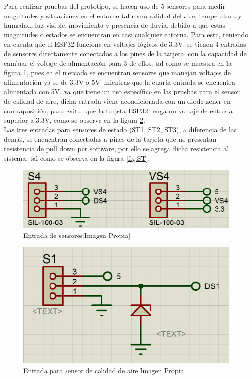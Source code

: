 		Para realizar pruebas del prototipo, se hacen uso de 5 sensores para medir magnitudes y situaciones en el entorno tal como calidad del aire, temperatura y humedad, luz visible, movimiento y presencia de lluvia, debido a que estas magnitudes o estados se encuentran en casi cualquier entorno. Para esto, teniendo en cuenta que el ESP32 funciona en voltajes lógicos de 3.3V, se tienen 4 entradas de sensores directamente conectados a los pines de la tarjeta, con la capacidad de cambiar el voltaje de alimentación para 3 de ellos, tal como se muestra en la figura \ref{fig:SVS}, pues en el mercado se encuentran sensores que manejan voltajes de alimentación ya se de 3.3V o 5V, mientras que la cuarta entrada se encuentra alimentada con 5V, ya que tiene un uso específico en las pruebas para el sensor de calidad de aire, dicha entrada viene acondicionada con un diodo zener en contraposición, para evitar que la tarjeta ESP32 tenga un voltaje de entrada superior a 3.3V, como se observa en la figura \ref{fig:S1Aire}.\\
		
		Las tres entradas para sensores de estado (ST1, ST2, ST3), a diferencia de las demás, se encuentran conectadas a pines de la tarjeta que no presentan resistencia de pull down por software, por ello se agrega dicha resistencia al sistema, tal como se observa en la figura \ref{fig:ST}.\\
		
		\begin{figure}[H]
			\centering
			\caption{Entrada de sensores[Imagen Propia]}
			\label{fig:SVS}
			\includegraphics[width=0.7\linewidth]{Imagenes/SVS}
		\end{figure}
	
		\begin{figure}[H]
			\centering
			\caption{Entrada para sensor de calidad de aire[Imagen Propia]}
			\label{fig:S1Aire}
			\includegraphics[width=0.6\linewidth]{Imagenes/S1Aire}
		\end{figure}
	
